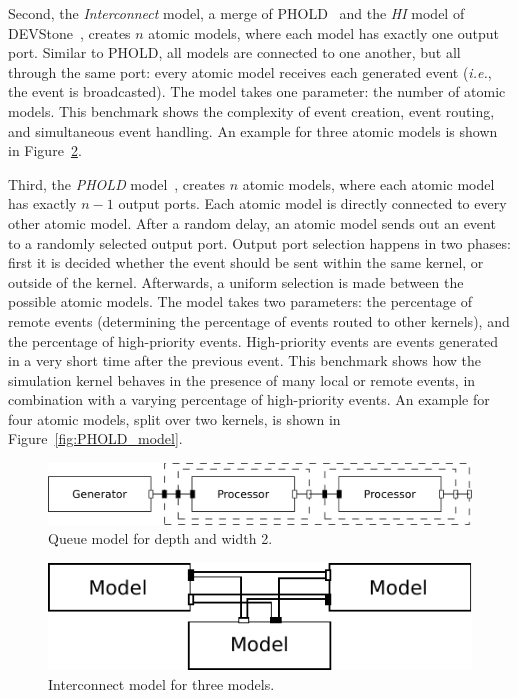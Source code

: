 Second, the \textit{Interconnect} model, a merge of PHOLD~\cite{PHOLD} and the \textit{HI} model of DEVStone~\cite{DEVStone}, creates $n$ atomic models, where each model has exactly one output port.
Similar to PHOLD, all models are connected to one another, but all through the same port: every atomic model receives each generated event (\textit{i.e.}, the event is broadcasted).
The model takes one parameter: the number of atomic models.
This benchmark shows the complexity of event creation, event routing, and simultaneous event handling.
An example for three atomic models is shown in Figure~\ref{fig:interconnect_model}.

Third, the \textit{PHOLD} model~\cite{PHOLD}, creates $n$ atomic models, where each atomic model has exactly $n-1$ output ports.
Each atomic model is directly connected to every other atomic model.
After a random delay, an atomic model sends out an event to a randomly selected output port.
Output port selection happens in two phases: first it is decided whether the event should be sent within the same kernel, or outside of the kernel.
Afterwards, a uniform selection is made between the possible atomic models.
The model takes two parameters: the percentage of remote events (determining the percentage of events routed to other kernels), and the percentage of high-priority events.
High-priority events are events generated in a very short time after the previous event.
This benchmark shows how the simulation kernel behaves in the presence of many local or remote events, in combination with a varying percentage of high-priority events.
An example for four atomic models, split over two kernels, is shown in Figure~\ref{fig:PHOLD_model}.

\begin{figure}
	\center
	\includegraphics[width=\columnwidth]{fig/queue_model_fixed.pdf}
	\caption{Queue model for depth and width 2.}
	\label{fig:queue_model}
\end{figure}
	
\begin{figure}
    \center
	\includegraphics[width=\modelfraction\columnwidth]{fig/interconnect_model.pdf}
	\caption{Interconnect model for three models.}
	\label{fig:interconnect_model}
\end{figure}


